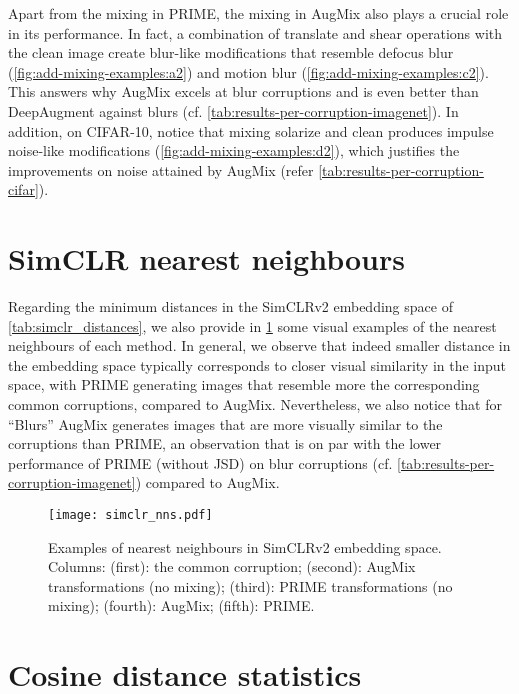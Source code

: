 \documentclass[runningheads]{llncs}
\begin{document}
Apart from the mixing in PRIME, the mixing in AugMix also plays a crucial role in its performance. In fact, a combination of translate and shear operations with the clean image create blur-like modifications that resemble defocus blur (\cref{fig:add-mixing-examples:a2}) and motion blur (\cref{fig:add-mixing-examples:c2}). This answers why AugMix excels at blur corruptions and is even better than DeepAugment against blurs (cf. \cref{tab:results-per-corruption-imagenet}). In addition, on CIFAR-10, notice that mixing solarize and clean produces impulse noise-like modifications (\cref{fig:add-mixing-examples:d2}), which justifies the improvements on noise attained by AugMix (refer \cref{tab:results-per-corruption-cifar}).

\clearpage
\newpage

\section{SimCLR nearest neighbours}
\label{app:simclr_NNs}

Regarding the minimum distances in the SimCLRv2 embedding space of \cref{tab:simclr_distances}, we also provide in \cref{fig:simclr_NNs} some visual examples of the nearest neighbours of each method. In general, we observe that indeed smaller distance in the embedding space typically corresponds to closer visual similarity in the input space, with PRIME generating images that resemble more the corresponding common corruptions, compared to AugMix. Nevertheless, we also notice that for ``Blurs'' AugMix generates images that are more visually similar to the corruptions than PRIME, an observation that is on par with the lower performance of PRIME (without JSD) on blur corruptions (cf. \cref{tab:results-per-corruption-imagenet}) compared to AugMix.

\begin{figure}[!ht]
\centering
\texttt{[image: simclr\_nns.pdf]}
\caption{Examples of nearest neighbours in SimCLRv2 embedding space. Columns: (first): the common corruption; (second): AugMix transformations (no mixing); (third): PRIME transformations (no mixing); (fourth): AugMix; (fifth): PRIME.}
\vspace{-0.8em}
\label{fig:simclr_NNs}
\end{figure}

\section{Cosine distance statistics}
\label{app:simclr_cosine_stats}
\end{document}
